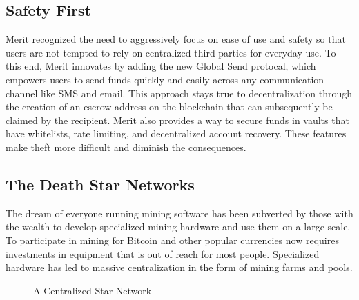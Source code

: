 \documentclass{article}
\begin{document}
\subsection{Safety First}
Merit recognized the need to aggressively focus on ease of use and safety so that
 users are not tempted to rely on centralized third-parties for everyday use.
To this end, Merit innovates by adding the new Global Send protocal, which 
empowers users to send funds quickly and easily across any communication channel 
like SMS and email.  This approach stays true to decentralization through the creation
of an escrow address on the blockchain that can subsequently be claimed by the recipient.
Merit also provides a way to secure funds in vaults that have whitelists, rate
limiting, and decentralized account recovery.  These features make theft more 
difficult and diminish the consequences.

\subsection{The Death Star Networks}
The dream of everyone running mining software has been subverted by those with
the wealth to develop specialized mining hardware and use them on a large scale.
To participate in mining for Bitcoin and other popular currencies now requires
investments in equipment that is out of reach for most people.  Specialized hardware has led
to massive centralization in the form of mining farms and pools.

\begin{figure}[H]
    \begin{center}
    \end{center}
    \caption{A Centralized Star Network}

\end{figure}
\end{document}
